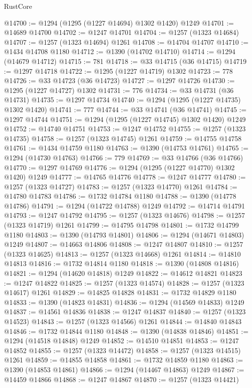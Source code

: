 \begin{lexlean}{RustCore}
\begin{coremodule}
@14700 := @1294 (@1295 (@1227 @14694) @1302 @1420) @1249
@14701 := @14689 @14700
@14702 := @1247 @14701
@14704 := @1257 (@1323 @14684)
@14707 := @1257 (@1323 @14694) @1261
@14708 := @14704 @14707
@14710 := @1434 @14708 @1180
@14712 := @1390 (@14702 @14710)
@14714 := @1294 (@14679 @14712)
@14715 := 781
@14718 := @33 @14715 (@36 @14715)
@14719 := @1297 @14718
@14722 := @1295 (@1227 @14719) @1302
@14723 := 778
@14726 := @33 @14723 (@36 @14723)
@14727 := @1297 @14726
@14730 := @1295 (@1227 @14727) @1302
@14731 := 776
@14734 := @33 @14731 (@36 @14731)
@14735 := @1297 @14734
@14740 := @1294 (@1295 (@1227 @14735) @1302 @1420)
@14741 := 777
@14744 := @33 @14741 (@36 @14741)
@14745 := @1297 @14744
@14751 := @1294 (@1295 (@1227 @14745) @1302 @1420) @1249
@14752 := @14740 @14751
@14753 := @1247 @14752
@14755 := @1257 (@1323 @14735)
@14758 := @1257 (@1323 @14745) @1261
@14759 := @14755 @14758
@14761 := @1434 @14759 @1180
@14763 := @1390 (@14753 @14761)
@14765 := @1294 (@14730 @14763)
@14766 := 779
@14769 := @33 @14766 (@36 @14766)
@14770 := @1297 @14769
@14776 := @1294 (@1295 (@1227 @14770) @1302 @1420) @1249
@14777 := @14765 @14776
@14778 := @1247 @14777
@14780 := @1257 (@1323 @14727)
@14783 := @1257 (@1323 @14770) @1261
@14784 := @14780 @14783
@14786 := @1732 @14784 @1180
@14788 := @1390 (@14778 @14786)
@14791 := @1294 (@14722 @14788) @1249
@14792 := @14714 @14791
@14793 := @1247 @14792
@14795 := @1257 (@1323 @14676)
@14798 := @1257 (@1323 @14719) @1261
@14799 := @14795 @14798
@14801 := @1732 @14799 @1180
@14803 := @1390 (@14793 @14801)
@14806 := @1294 (@14671 @14803) @1249
@14807 := @14663 @14806
@14808 := @1247 @14807
@14810 := @1257 (@1323 @14625)
@14813 := @1257 (@1323 @14668) @1261
@14814 := @14810 @14813
@14816 := @1732 @14814 @1180
@14818 := @1390 (@14808 @14816)
@14821 := @1294 (@14620 @14818) @1249
@14822 := @14612 @14821
@14823 := @1247 @14822
@14825 := @1257 (@1323 @14574)
@14828 := @1257 (@1323 @14617) @1261
@14829 := @14825 @14828
@14831 := @1732 @14829 @1180
@14833 := @1390 (@14823 @14831)
@14836 := @1294 (@14569 @14833) @1249
@14837 := @14561 @14836
@14838 := @1247 @14837
@14840 := @1257 (@1323 @14523)
@14843 := @1257 (@1323 @14566) @1261
@14844 := @14840 @14843
@14846 := @1732 @14844 @1180
@14848 := @1390 (@14838 @14846)
@14851 := @1294 (@14518 @14848) @1249
@14852 := @14510 @14851
@14853 := @1247 @14852
@14855 := @1257 (@1323 @14472)
@14858 := @1257 (@1323 @14515) @1261
@14859 := @14855 @14858
@14861 := @1732 @14859 @1180
@14863 := @1390 (@14853 @14861)
@14866 := @1294 (@14467 @14863) @1249
@14867 := @14459 @14866
@14868 := @1247 @14867
@14870 := @1257 (@1323 @14421)

\end{coremodule}
\end{lexlean}
